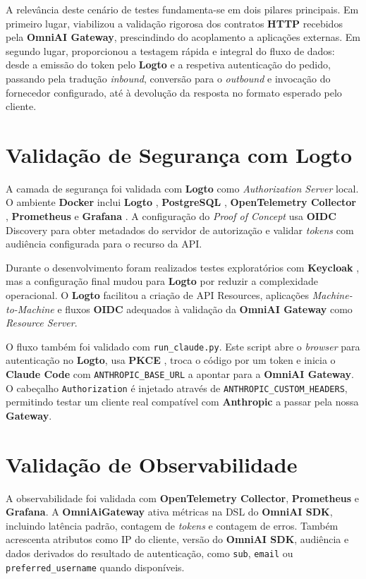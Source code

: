     A relevância deste cenário de testes fundamenta-se em dois pilares principais. Em primeiro lugar, viabilizou a validação rigorosa dos contratos \textbf{HTTP} recebidos pela \textbf{OmniAI Gateway}, prescindindo do acoplamento a aplicações externas. Em segundo lugar, proporcionou a testagem rápida e integral do fluxo de dados: desde a emissão do token pelo \textbf{Logto} e a respetiva autenticação do pedido, passando pela tradução \textit{inbound}, conversão para o \textit{outbound} e invocação do fornecedor configurado, até à devolução da resposta no formato esperado pelo cliente.

    \section{Validação de Segurança com \textbf{Logto}}
    A camada de segurança foi validada com \textbf{Logto} como \textit{Authorization Server} local. O ambiente \textbf{Docker} inclui \textbf{Logto} \cite{logto_docs}, \textbf{PostgreSQL} \cite{postgresql_ref}, \textbf{OpenTelemetry Collector} \cite{opentelemetry_otlp}, \textbf{Prometheus} \cite{prometheus_ref} e \textbf{Grafana} \cite{grafana_ref}. A configuração do \textit{Proof of Concept} usa \textbf{OIDC} Discovery \cite{oidc_discovery} para obter metadados do servidor de autorização e validar \textit{tokens} com audiência configurada para o recurso da API.

    Durante o desenvolvimento foram realizados testes exploratórios com \textbf{Keycloak} \cite{keycloak_docs}, mas a configuração final mudou para \textbf{Logto} \cite{logto_docs} por reduzir a complexidade operacional. O \textbf{Logto} facilitou a criação de API Resources, aplicações \textit{Machine-to-Machine} e fluxos \textbf{OIDC} adequados à validação da \textbf{OmniAI Gateway} como \textit{Resource Server}\cite{resource_ref}.

    O fluxo também foi validado com \texttt{run\_claude.py}. Este script abre o \textit{browser} para autenticação no \textbf{Logto}, usa \textbf{PKCE} \cite{pkce_ref}, troca o código por um token e inicia o \textbf{Claude Code} com \texttt{ANTHROPIC\_BASE\_URL} a apontar para a \textbf{OmniAI Gateway}. O cabeçalho \texttt{Authorization} é injetado através de \texttt{ANTHROPIC\_CUSTOM\_HEADERS}, permitindo testar um cliente real compatível com \textbf{Anthropic} a passar pela nossa \textbf{Gateway}.

    \section{Validação de Observabilidade}
    A observabilidade foi validada com \textbf{OpenTelemetry Collector}, \textbf{Prometheus} e \textbf{Grafana}. A \textbf{OmniAiGateway} ativa métricas na DSL do \textbf{OmniAI SDK}, incluindo latência padrão, contagem de \textit{tokens} e contagem de erros. Também acrescenta atributos como IP do cliente, versão do \textbf{OmniAI SDK}, audiência e dados derivados do resultado de autenticação, como \texttt{sub}, \texttt{email} ou \texttt{preferred\_username} quando disponíveis.

